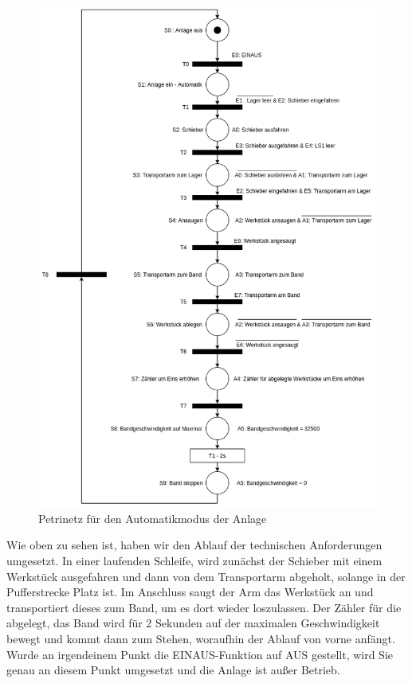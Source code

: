 \documentclass{report}
\begin{document}
\begin{figure}[H]
  \centering
  \includegraphics[width=\textwidth]{../assets/images/ST2/petrinetz.png}
  \caption{Petrinetz für den Automatikmodus der Anlage}
\label{fig:petrinetz}
\end{figure}
\newpage
Wie oben zu sehen ist, haben wir den Ablauf der technischen Anforderungen umgesetzt. In einer laufenden Schleife, wird zunächst der Schieber mit einem Werkstück ausgefahren und dann von dem Transportarm abgeholt, solange in der Pufferstrecke Platz ist. Im Anschluss saugt der Arm das Werkstück an und transportiert dieses zum Band, um es dort wieder loszulassen. Der Zähler für die abgelegt, das Band wird für 2 Sekunden auf der maximalen Geschwindigkeit bewegt und kommt dann zum Stehen, woraufhin der Ablauf von vorne anfängt. Wurde an irgendeinem Punkt die EINAUS-Funktion auf AUS gestellt, wird Sie genau an diesem Punkt umgesetzt und die Anlage ist außer Betrieb.
\end{document}
